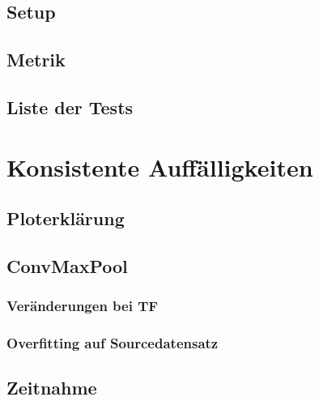 \documentclass[ngerman]{report}
\begin{document}
    \section{Setup}
    
    \section{Metrik}
    
    \section{Liste der Tests}
    

    \chapter{Konsistente Auffälligkeiten}  %
    
    \section{Ploterklärung}
    
    \section{ConvMaxPool}
    
    \subsection{Veränderungen bei TF}
    
    \subsection{Overfitting auf Sourcedatensatz}
    
    \section{Zeitnahme}
    
\end{document}
